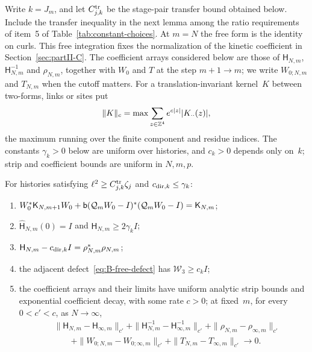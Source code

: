 Write $k=J_m$, and let $C^{\rm tr}_{j,k}$ be the stage-pair transfer bound obtained below. Include the transfer inequality in the next lemma among the ratio requirements of item~5 of Table~\ref{tab:constant-choices}. At $m=N$ the free form is the identity on curls. This free integration fixes the normalization of the kinetic coefficient in Section~\ref{sec:partII-C}. The coefficient arrays considered below are those of $\mathsf H_{N,m}$, $\mathsf H_{N,m}^{-1}$ and $\rho_{N,m}$, together with $W_0$ and $T$ at the step $m+1\to m$; we write $W_{0;N,m}$ and $T_{N,m}$ when the cutoff matters. For a translation-invariant kernel~$K$ between two-forms, links or sites put
\begin{equation*}
\|K\|_c=\max\sum_{z\in\mathbb{Z}^4}e^{c|z|}|K_{\cdot\cdot}(z)|,
\end{equation*}
the maximum running over the finite component and residue indices. The constants $\gamma_k>0$ below are uniform over histories, and $c_k>0$ depends only on~$k$; strip and coefficient bounds are uniform in $N,m,p$.
\begin{lemma}\label{lem:B2}
For histories satisfying $\ell^2\ge C^{\rm tr}_{j,k}\zeta_j$ and $c_{{\rm dir},k}\le\gamma_k$:
\begin{enumerate}[label=(\roman*)]
\item $W_0^*\mathsf K_{N,m+1}W_0+\mathsf{b}(\mathcal Q_mW_0-I)^*(\mathcal Q_mW_0-I)=\mathsf K_{N,m}$;
\item $\widehat{\mathsf H}_{N,m}(0)=I$ and $\mathsf H_{N,m}\ge2\gamma_{k}I$;
\item $\mathsf H_{N,m}-c_{{\rm dir},k}I=\rho_{N,m}^*\rho_{N,m}$;
\item the adjacent defect~\eqref{eq:B-free-defect} has $\mathcal W_3\ge c_kI$;
\item the coefficient arrays and their limits have uniform analytic strip bounds and exponential coefficient decay, with some rate $c>0$; at fixed~$m$, for every $0<c'<c$, as $N\to\infty$,
\begin{equation}\label{eq:B-free-limit}
\begin{aligned}
&\|\mathsf H_{N,m}-\mathsf H_{\infty,m}\|_{c'}
+\|\mathsf H_{N,m}^{-1}-\mathsf H_{\infty,m}^{-1}\|_{c'}
+\|\rho_{N,m}-\rho_{\infty,m}\|_{c'}\\
&\qquad+\|W_{0;N,m}-W_{0;\infty,m}\|_{c'}
+\|T_{N,m}-T_{\infty,m}\|_{c'}\longrightarrow0.
\end{aligned}
\end{equation}
\end{enumerate}
\end{lemma}
